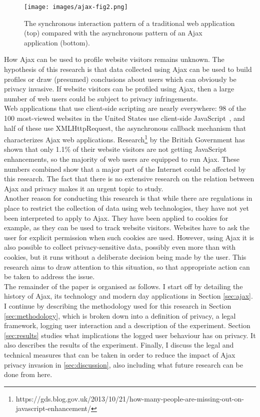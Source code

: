 \begin{figure}[h]	
	\centering
	\texttt{[image: images/ajax-fig2.png]}
	\caption{The synchronous interaction pattern of a traditional web application (top) compared with the asynchronous pattern of an Ajax application (bottom).}
	\label{fig:model}
\end{figure}
	
How Ajax can be used to profile website visitors remains unknown. The hypothesis of this research is that data collected using Ajax can be used to build profiles or draw (presumed) conclusions about users which can obviously be privacy invasive. If website visitors can be profiled using Ajax, then a large number of web users could be subject to privacy infringements.\\	
	
Web applications that use client-side scripting are nearly everywhere: 98 of the 100 most-viewed websites in the United States use client-side JavaScript~\cite{guha2009using}, and half of these use XMLHttpRequest, the asynchronous callback mechanism that characterizes Ajax web applications. Research\footnote{https://gds.blog.gov.uk/2013/10/21/how-many-people-are-missing-out-on-javascript-enhancement/} by the British Government has shown that only 1.1\% of their website visitors are not getting JavaScript enhancements, so the majority of web users are equipped to run Ajax. These numbers combined show that a major part of the Internet could be affected by this research. The fact that there is no extensive research on the relation between Ajax and privacy makes it an urgent topic to study.\\

Another reason for conducting this research is that while there are regulations in place to restrict the collection of data using web technologies, they have not yet been interpreted to apply to Ajax. They have been applied to cookies for example, as they can be used to track website visitors. Websites have to ask the user for explicit permission when such cookies are used. However, using Ajax it is also possible to collect privacy-sensitive data, possibly even more than with cookies, but it runs without a deliberate decision being made by the user. This research aims to draw attention to this situation, so that appropriate action can be taken to address the issue.\\
	
The remainder of the paper is organised as follows. I start off by detailing the history of Ajax, its technology and modern day applications in Section \ref{sec:ajax}. I continue by describing the methodology used for this research in Section \ref{sec:methodology}, which is broken down into a definition of privacy, a legal framework, logging user interaction and a description of the experiment. Section \ref{sec:results} studies what implications the logged user behaviour has on privacy. It also describes the results of the experiment. Finally, I discuss the legal and technical measures that can be taken in order to reduce the impact of Ajax privacy invasion in \ref{sec:discussion}, also including what future research can be done from here.\\

